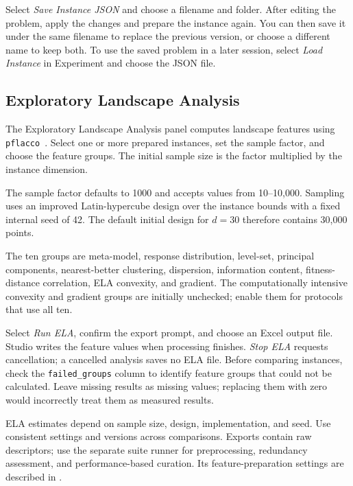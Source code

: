 \documentclass[journal,onecolumn]{IEEEtran}
\begin{document}
Select \emph{Save Instance JSON} and choose a filename and folder. After editing the problem, apply the changes and prepare the instance again. You can then save it under the same filename to replace the previous version, or choose a different name to keep both. To use the saved problem in a later session, select \emph{Load Instance} in Experiment and choose the JSON file.

\subsection{Exploratory Landscape Analysis}
\label{ssec:manual:generator-ela}

The Exploratory Landscape Analysis panel computes landscape features using \texttt{pflacco}~\cite{prager2024pflacco}. Select one or more prepared instances, set the sample factor, and choose the feature groups. The initial sample size is the factor multiplied by the instance dimension.

The sample factor defaults to 1000 and accepts values from 10--10,000. Sampling uses an improved Latin-hypercube design over the instance bounds with a fixed internal seed of 42. The default initial design for $d=30$ therefore contains 30,000 points.

The ten groups are meta-model, response distribution, level-set, principal components, nearest-better clustering, dispersion, information content, fitness-distance correlation, ELA convexity, and gradient. The computationally intensive convexity and gradient groups are initially unchecked; enable them for protocols that use all ten.

Select \emph{Run ELA}, confirm the export prompt, and choose an Excel output file. Studio writes the feature values when processing finishes. \emph{Stop ELA} requests cancellation; a cancelled analysis saves no ELA file. Before comparing instances, check the \texttt{failed\_groups} column to identify feature groups that could not be calculated. Leave missing results as missing values; replacing them with zero would incorrectly treat them as measured results.

ELA estimates depend on sample size, design, implementation, and seed. Use consistent settings and versions across comparisons. Exports contain raw descriptors; use the separate suite runner for preprocessing, redundancy assessment, and performance-based curation. Its feature-preparation settings are described in .
\end{document}
